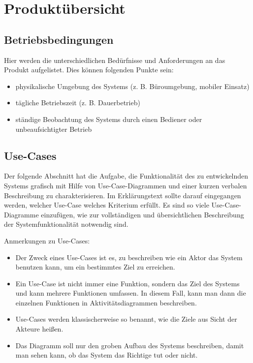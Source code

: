 
\chapter{Produktübersicht}
\label{chap:product_overview}

\section{Betriebsbedingungen}
Hier werden die unterschiedlichen Bedürfnisse und Anforderungen an das Produkt
aufgelistet. Dies können folgenden Punkte sein:
\begin{itemize}
\item physikalische Umgebung des Systems (z. B. Büroumgebung, mobiler Einsatz)
\item tägliche Betriebszeit (z. B. Dauerbetrieb)
\item ständige Beobachtung des Systems durch einen Bediener oder unbeaufsichtigter Betrieb
\end{itemize}

\section{Use-Cases}

Der folgende Abschnitt hat die Aufgabe, die Funktionalität des zu entwickelnden
Systems grafisch mit Hilfe von Use-Case-Diagrammen und einer kurzen verbalen
Beschreibung zu charakterisieren. Im Erklärungstext sollte darauf eingegangen werden,
welcher Use-Case welches Kriterium erfüllt. Es sind so viele Use-Case-Diagramme einzufügen,
wie zur vollständigen und übersichtlichen Beschreibung der Systemfunktionalität
notwendig sind. 

Anmerkungen zu Use-Cases:

\begin{itemize}
	\item Der Zweck eines Use-Cases ist es, zu beschreiben wie ein Aktor das System benutzen kann,
	 	um ein bestimmtes Ziel zu erreichen.
	\item Ein Use-Case ist nicht immer eine Funktion, sondern das Ziel des Systems und kann mehrere 
		Funktionen umfassen.
		In diesem Fall, kann man dann die einzelnen Funktionen in Aktivitätsdiagrammen beschreiben.
	\item Use-Cases werden klassischerweise so benannt, wie die Ziele aus Sicht der Akteure heißen.
	\item Das Diagramm soll nur den groben Aufbau des Systems beschreiben, damit man sehen kann,
		 ob das System das Richtige tut oder nicht.
\end{itemize}


